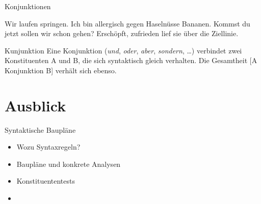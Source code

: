 \begin{frame}
  {Konjunktionen}
  \onslide<+->
  \onslide<+->
  \begin{exe}
    \ex
    \begin{xlist}
      \ex Wir \alert{laufen}  \alert{springen}.
      \ex Ich bin allergisch gegen \alert{Haselnüsse}  \alert{Bananen}.
      \ex \alert{Kommst du jetzt}  \alert{sollen wir schon gehen}?
      \ex \alert{Erschöpft},  \alert{zufrieden} lief sie über die Ziellinie.
    \end{xlist}
  \end{exe}
  \onslide<+->
  \begin{block}{Kunjunktion}
    Eine Konjunktion (\textit{und}, \textit{oder}, \textit{aber}, \textit{sondern}, \ldots) verbindet zwei Konstituenten A und B, die sich syntaktisch gleich verhalten. Die Gesamtheit [A Konjunktion B] verhält sich ebenso.
  \end{block}
\end{frame}



\section{Ausblick}

\begin{frame}
  {Syntaktische Baupläne}
  \onslide<+->
  \begin{itemize}[<+->]
    \item Wozu Syntaxregeln?
    \item Baupläne und konkrete Analysen
    \item Konstituententests
      \Zeile
    \item \citet[Kapitel 11]{Schaefer2018b}
  \end{itemize}
\end{frame}
